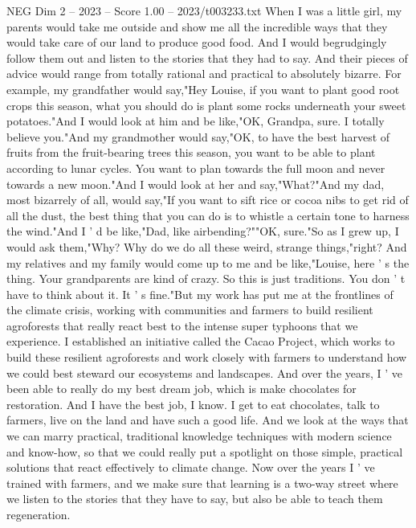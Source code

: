 \begin{textsample}{NEG Dim 2 – 2023 – Score 1.00 – 2023/t003233.txt}  \label{ex:f2_neg_047}
When I was a little girl, my parents would take me outside and show me all the incredible ways that they would take care of our land to produce good food.
And I would begrudgingly follow them out and listen to the stories that they had to say.
And their pieces of advice would range from totally rational and practical to absolutely bizarre.
For example, my grandfather would say,"Hey Louise, if you want to plant good root crops this season, what you should do is plant some rocks underneath your sweet potatoes."And I would look at him and be like,"OK, Grandpa, sure.
I totally believe you."And my grandmother would say,"OK, to have the best harvest of fruits from the fruit-bearing trees this season, you want to be able to plant according to lunar cycles.
You want to plan towards the full moon and never towards a new moon."And I would look at her and say,"What?"And my dad, most bizarrely of all, would say,"If you want to sift rice or cocoa nibs to get rid of all the dust, the best thing that you can do is to whistle a certain tone to harness the wind."And I ' d be like,"Dad, like airbending?""OK, sure."So as I grew up, I would ask them,"Why?
Why do we do all these weird, strange things,"right?
And my relatives and my family would come up to me and be like,"Louise, here ' s the thing.
Your grandparents are kind of crazy.
So this is just traditions.
You don ' t have to think about it.
It ' s fine."But my work has put me at the frontlines of the climate crisis, working with communities and farmers to build resilient agroforests that really react best to the intense super typhoons that we experience.
I established an initiative called the Cacao Project, which works to build these resilient agroforests and work closely with farmers to understand how we could best steward our ecosystems and landscapes.
And over the years, I ' ve been able to really do my best dream job, which is make chocolates for restoration.
And I have the best job, I know.
I get to eat chocolates, talk to farmers, live on the land and have such a good life.
And we look at the ways that we can marry practical, traditional knowledge techniques with modern science and know-how, so that we could really put a spotlight on those simple, practical solutions that react effectively to climate change.
Now over the years I ' ve trained with farmers, and we make sure that learning is a two-way street where we listen to the stories that they have to say, but also be able to teach them regeneration.

\end{textsample}
